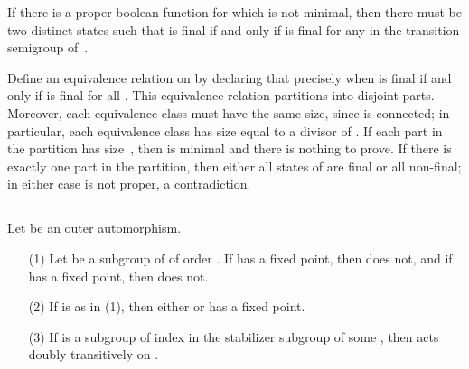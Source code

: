 \documentclass{llncs}
\begin{document}
\begin{remark}
\label{rem:equiv}
If  there is a proper boolean function  for which  is not minimal, then there must be two distinct states   such that  is final if and only if  is final for any  in the transition semigroup of~.  

Define an equivalence relation on  by declaring that  precisely when   is final if and only if  is final for all .  
This equivalence relation partitions  into disjoint parts.  Moreover, each equivalence class must have the same size, since  is connected; in particular, each equivalence class has size equal to a divisor of .  If each part in the partition has size~, then  is minimal and there is nothing to prove.   
If there is exactly one part in the partition, then either all states of  are final or all non-final; in either case  is not proper, a contradiction. 
\end{remark}
\subsection{}

\begin{lemma}
Let  be an outer automorphism.  
\begin{enumerate}
\item[(1)] Let  be a subgroup of  of order . 
If  has a fixed point, then   does not, and 
if  has a fixed point, then  does not.
\item[(2)] 
If  is as in (1), then either  or  has a fixed point. 
\item[(3)]
If  is a subgroup of index  in the stabilizer subgroup of some , then  acts doubly transitively on .
\end{enumerate}
\label{lem:s6}
\end{lemma}
\end{document}
